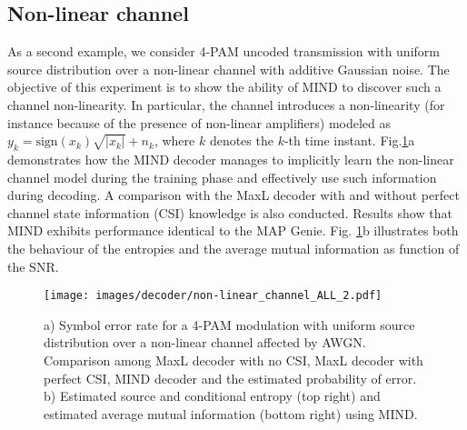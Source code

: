 \subsection{Non-linear channel}
As a second example, we consider 4-PAM uncoded transmission with uniform source distribution over a non-linear channel with additive Gaussian noise. The objective of this experiment is to show the ability of MIND to discover such a channel non-linearity. In particular, the channel introduces a non-linearity (for instance because of the presence of non-linear amplifiers) modeled as $y_k=\text{sign}(x_k)\sqrt{|x_k|}+n_k$, where $k$ denotes the $k$-th time instant.
Fig.\ref{fig:MIND_non-linear_channel}a demonstrates how the MIND decoder manages to implicitly learn the non-linear channel model during the training phase and effectively use such information during decoding. A comparison with the MaxL decoder with and without perfect channel state information (CSI) knowledge is also conducted. Results show that MIND exhibits performance identical to the MAP Genie. Fig. \ref{fig:MIND_non-linear_channel}b illustrates both the behaviour of the entropies and the average mutual information as function of the SNR.

\begin{figure}
\centering
   \texttt{[image: images/decoder/non-linear\_channel\_ALL\_2.pdf]}
  \caption{a) Symbol error rate for a 4-PAM modulation with uniform source distribution over a non-linear channel affected by AWGN. Comparison among MaxL decoder with no CSI, MaxL decoder with perfect CSI, MIND decoder and the estimated probability of error. b) Estimated source and conditional entropy (top right) and estimated average mutual information (bottom right) using MIND.}
  \label{fig:MIND_non-linear_channel}
\end{figure}

